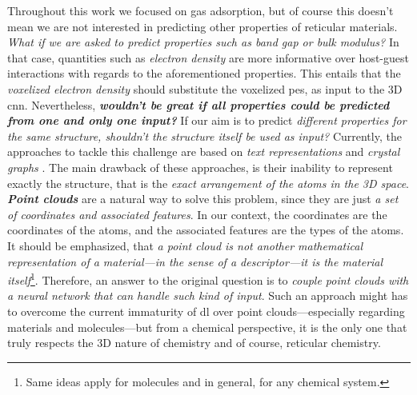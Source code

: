 Throughout this work we focused on gas adsorption, but of course this doesn't
mean we are not interested in predicting other properties of reticular
materials. \emph{What if we are asked to predict
properties such as band gap or bulk modulus?} In that case, quantities such as
\emph{electron density} are more informative over
host-guest interactions with regards to the
aforementioned properties. This entails that the \emph{voxelized electron
density} should substitute the voxelized
\gls{pes}, as input to the 3D \gls{cnn}. Nevertheless, \emph{\textbf{wouldn't be
great if all properties could be predicted from one and only one input?}} If our
aim is to predict \emph{different properties for the same structure, shouldn't
the structure itself be used as input?} Currently, the approaches to tackle this
challenge are based on \emph{text representations}
\parencite{Cao2023, Bucior2019} and \emph{crystal graphs}
\parencite{Chen2019, Xie2018}. The main drawback of these approaches, is their
inability to represent exactly the structure, that is the \emph{exact
arrangement of the atoms in the 3D space}. \emph{\textbf{Point clouds}}
\parencite{Qi2016, Bello2020} are a natural way to solve this problem, since
they are just \emph{a set of coordinates and associated
features}. In our context, the coordinates are the coordinates of the atoms, and
the associated features are the types of the atoms. It should be emphasized,
that \emph{a point cloud is not another mathematical
representation of a material---in the sense of a
descriptor---it is the material itself}\footnote{Same ideas
apply for molecules and in general, for any chemical system.}. Therefore, an answer to the original question is to \emph{couple
point clouds with a neural network that can handle such kind of input}. Such an
approach might has to overcome the current immaturity of \gls{dl} over point
clouds---especially regarding materials and molecules---but from a chemical
perspective, it is the only one that truly respects the 3D nature of chemistry
and of course, reticular chemistry.
